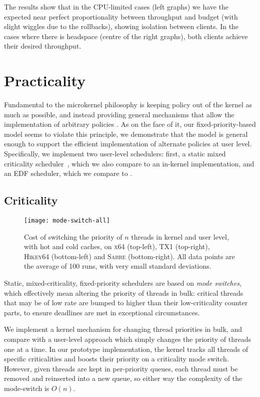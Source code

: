 The results show that in the CPU-limited cases (left graphs)
we have the expected near perfect proportionality between throughput and
budget (with slight wiggles due to the rollbacks), showing isolation between clients. In the cases where there is headspace (centre of the right
graphs), both clients achieve their desired throughput.

\section{Practicality}

Fundamental to the microkernel philosophy is keeping policy out of the
kernel as much as possible, and instead providing general mechanisms
that allow the implementation of arbitrary policies
\citep{Heiser_Elphinstone_16}.  As on the face of it, our
fixed-priority-based model seems to violate this principle,  we
demonstrate that the model is general enough to support the efficient
implementation of alternate policies at user level. Specifically, we
implement two user-level schedulers: first, a static mixed criticality
scheduler~\citep{Baruah_BD_11}, which we also compare to an in-kernel
implementation, and an \gls{EDF} scheduler, which we compare to \litmus.

\subsection{Criticality}

\begin{figure}[t]
  \centering
  \texttt{[image: mode-switch-all]}
  \caption[Kernel vs. user-level criticality switch.]{Cost of switching the priority of $n$ threads in kernel and user level, with hot
      and cold caches, on \textsc{x64} (top-left), \textsc{TX1} (top-right), \textsc{Hikey64}
      (bottom-left) and \textsc{Sabre} (bottom-right). All data points are the average of 100 runs,
                  with very small standard deviations.}
  \label{f:mode-switch}
\end{figure}


Static, mixed-criticality, fixed-priority schedulers are based on \emph{mode
switches}, which effectively mean altering the priority of threads in bulk:
critical threads that may be of low rate are bumped to higher than their
low-criticality counter parts, to ensure deadlines are met in exceptional
circumstances. 

We implement a kernel mechanism for changing thread priorities in bulk,
and compare with a user-level approach which simply changes the priority of threads
one at a time. In our prototype implementation, the kernel tracks all threads of specific
criticalities and boosts their priority on a criticality mode switch. However, given threads are kept in per-priority queues, each thread must be removed and reinserted into a new queue, so either way the complexity of the mode-switch is $O(n)$. 


